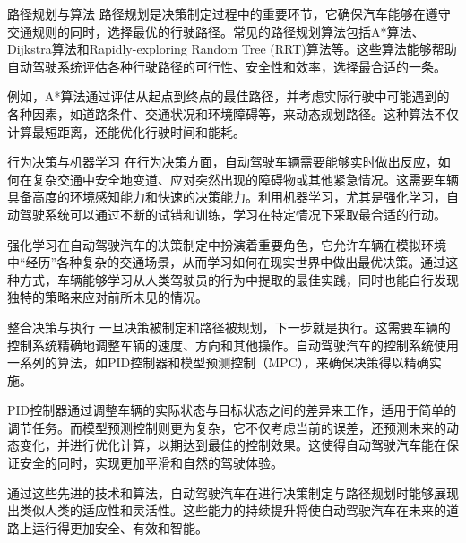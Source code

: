 路径规划与算法
路径规划是决策制定过程中的重要环节，它确保汽车能够在遵守交通规则的同时，选择最优的行驶路径。常见的路径规划算法包括A*算法、Dijkstra算法和Rapidly-exploring Random Tree (RRT)算法等。这些算法能够帮助自动驾驶系统评估各种行驶路径的可行性、安全性和效率，选择最合适的一条。

例如，A*算法通过评估从起点到终点的最佳路径，并考虑实际行驶中可能遇到的各种因素，如道路条件、交通状况和环境障碍等，来动态规划路径。这种算法不仅计算最短距离，还能优化行驶时间和能耗。

行为决策与机器学习
在行为决策方面，自动驾驶车辆需要能够实时做出反应，如何在复杂交通中安全地变道、应对突然出现的障碍物或其他紧急情况。这需要车辆具备高度的环境感知能力和快速的决策能力。利用机器学习，尤其是强化学习，自动驾驶系统可以通过不断的试错和训练，学习在特定情况下采取最合适的行动。

强化学习在自动驾驶汽车的决策制定中扮演着重要角色，它允许车辆在模拟环境中“经历”各种复杂的交通场景，从而学习如何在现实世界中做出最优决策。通过这种方式，车辆能够学习从人类驾驶员的行为中提取的最佳实践，同时也能自行发现独特的策略来应对前所未见的情况。

整合决策与执行
一旦决策被制定和路径被规划，下一步就是执行。这需要车辆的控制系统精确地调整车辆的速度、方向和其他操作。自动驾驶汽车的控制系统使用一系列的算法，如PID控制器和模型预测控制（MPC），来确保决策得以精确实施。

PID控制器通过调整车辆的实际状态与目标状态之间的差异来工作，适用于简单的调节任务。而模型预测控制则更为复杂，它不仅考虑当前的误差，还预测未来的动态变化，并进行优化计算，以期达到最佳的控制效果。这使得自动驾驶汽车能在保证安全的同时，实现更加平滑和自然的驾驶体验。

通过这些先进的技术和算法，自动驾驶汽车在进行决策制定与路径规划时能够展现出类似人类的适应性和灵活性。这些能力的持续提升将使自动驾驶汽车在未来的道路上运行得更加安全、有效和智能。

